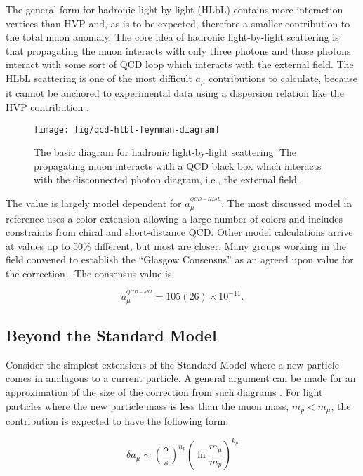 The general form for hadronic light-by-light (HLbL) contains more interaction vertices than HVP and, as is to be expected, therefore a smaller contribution to the total muon anomaly.  The core idea of hadronic light-by-light scattering is that propagating the muon interacts with only three photons and those photons interact with some sort of QCD loop which interacts with the external field.  The HLbL scattering is one of the most difficult $a_\mu$ contributions to calculate, because it cannot be anchored to experimental data using a dispersion relation like the HVP contribution \cite{the-muon-g-2}.

\begin{figure}
\centering
\texttt{[image: fig/qcd-hlbl-feynman-diagram]}
\caption{The basic diagram for hadronic light-by-light scattering.  The propagating muon interacts with a QCD black box which interacts with the disconnected photon diagram, i.e., the external field. \label{fig:qcd-hlbl-feynman-diagram}}
\end{figure}

The value is largely model dependent for $a_\mu^{^{QCD-HLbL}}$.  The most discussed model in reference \cite{amm-of-muon} uses a color extension allowing a large number of colors and includes constraints from chiral and short-distance QCD.  Other model calculations arrive at values up to 50\% different, but most are closer.  Many groups working in the field convened to establish the ``Glasgow Consensus'' as an agreed upon value for the correction \cite{e989-tdr}.  The consensus value is

\begin{equation}
\label{eqn:qcd-hlbl-total}
a_\mu^{^{QCD-hlbl}} = 105(26) \times 10^{-11}.
\end{equation}

\subsection{Beyond the Standard Model}

Consider the simplest extensions of the Standard Model where a new particle comes in analagous to a current particle.  A general argument can be made for an approximation of the size of the correction from such diagrams \cite{the-muon-g-2}.  For light particles where the new particle mass is less than the muon mass, $m_p < m_\mu$, the contribution is expected to have the following form:

\begin{equation}
\label{eqn:bsm-general-small-m}
\delta a_\mu \sim \left(\frac{\alpha}{\pi}\right)^{n_p} \left( \ln{\frac{m_\mu}{m_p}} \right)^{k_p}
\end{equation}

